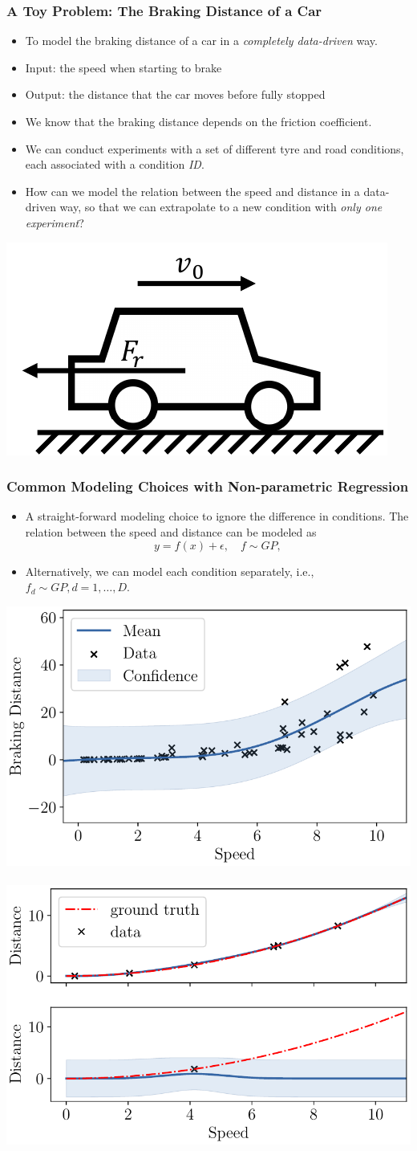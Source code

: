 \documentclass[aspectratio=169]{beamer}
\begin{document}
  \begin{frame}
    \frametitle{A Toy Problem: The Braking Distance of a Car}
    \begin{itemize}
    \item To model the braking distance of a car in a \emph{completely data-driven} way.
    \item Input: the speed when starting to brake
    \item Output: the distance that the car moves before fully stopped
    \item We know that the braking distance depends on the friction coefficient.
    \item We can conduct experiments with a set of different tyre and road conditions, each associated with a condition \emph{ID}.
    \item How can we model the relation between the speed and distance in a data-driven way, so that we can extrapolate to a new condition with \emph{only one experiment}?
    \end{itemize}
    \begin{center}
    \includegraphics[width=.3\linewidth]{braking_diagram} 
    \end{center}
  \end{frame}
  
  \begin{frame}
    \frametitle{Common Modeling Choices with Non-parametric Regression}
    \begin{itemize}
    \item A straight-forward modeling choice to ignore the difference in conditions. The relation between the speed and distance can be modeled as
\begin{equation*}
y = f(x) + \epsilon,\quad f \sim GP, \label{eqn:simple_model}
\end{equation*}
    \item Alternatively, we can model each condition separately, i.e., $f_d \sim GP, d=1,\ldots,D$.
    \end{itemize}
    \begin{center}
    \includegraphics[width=.35\linewidth]{braking_all} ~ 
    \includegraphics[width=.35\linewidth]{braking_separate}
    \end{center}
  \end{frame}
\end{document}
